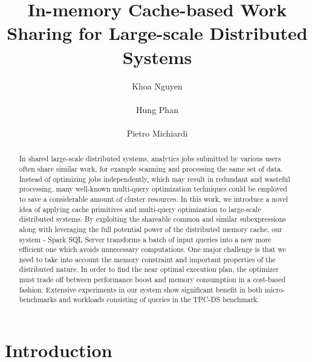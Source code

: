 \documentclass{acmsig}
\begin{document}
\title{In-memory Cache-based Work Sharing for Large-scale Distributed Systems}


\author{
\alignauthor
Khoa Nguyen\\
       \\
\alignauthor
Hung Phan\\
       \\
\alignauthor 
Pietro Michiardi
       \\
}
\maketitle

\begin{abstract}
In shared large-scale distributed systems, analytics jobs submitted by various users often share similar work, for example scanning and processing the same set of data. Instead of optimizing jobs independently, which may result in redundant and wasteful processing, many well-known multi-query optimization techniques could be employed to save a considerable amount of cluster resources. In this work, we introduce a novel idea of applying cache primitives and multi-query optimization to large-scale distributed systems. By exploiting the shareable common and similar subexpressions along with leveraging the full potential power of the distributed memory cache, our system - Spark SQL Server transforms a batch of input queries into a new more efficient one which avoids unnecessary computations. One major challenge is that we need to take into account the memory constraint and important properties of the distributed nature. In order to find the near optimal execution plan, the optimizer must trade off between performance boost and memory consumption in a cost-based fashion. Extensive experiments in our system show significant benefit in both micro-benchmarks and workloads consisting of queries in the TPC-DS benchmark.
\end{abstract}

\section{Introduction}
\label{sec:introduction}

\end{document}
